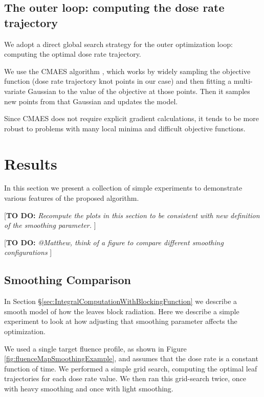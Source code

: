 \documentclass[12pt]{article}
\newcommand{\todo}[1]{{\color{lightblue}\par {[{\bf TO DO: } {\em #1}} ] \\    }}
\begin{document}

\subsection{The outer loop: computing the dose rate trajectory}
We adopt a direct global search strategy for the outer optimization loop: computing the optimal dose rate trajectory.

We use the CMAES algorithm \cite{Hansen2001}, which
works by widely sampling the objective function (dose rate trajectory knot points in our case) and then fitting a multi-variate Gaussian to the value of the objective at those points.
Then it samples new points from that Gaussian and updates the model.

Since CMAES does not require explicit gradient calculations, it tends to be more robust to problems with many local minima and difficult objective functions.


\section{Results}

In this section we present a collection of simple experiments to demonstrate various features of the
proposed algorithm.

\todo{Recompute the plots in this section to be consistent with new definition of the smoothing
      parameter.}
\todo{@Matthew, think of a figure to compare different smoothing configurations}

\subsection{Smoothing Comparison}
\label{sec:LeafSmoothingComparison}

In Section \S\ref{sec:IntegralComputationWithBlockingFunction} we describe a smooth model of how the leaves block radiation.
Here we describe a simple experiment to look at how adjusting that smoothing parameter affects the optimization.

We used a single target fluence profile, as shown in Figure \ref{fig:fluenceMapSmoothingExample},
and assumes that the dose rate is a constant function of time.
We performed a simple grid search, computing the optimal leaf trajectories for each dose rate value.
We then ran this grid-search twice, once with heavy smoothing and once with light smoothing.
\end{document}
